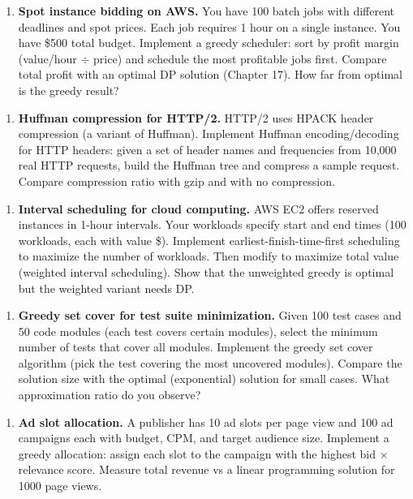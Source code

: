 \begin{enumerate}
\item \textbf{Spot instance bidding on AWS.} You have 100 batch jobs with different deadlines and spot prices. Each job requires 1 hour on a single instance. You have \$500 total budget. Implement a greedy scheduler: sort by profit margin (value/hour $\div $ price) and schedule the most profitable jobs first. Compare total profit with an optimal DP solution (Chapter 17). How far from optimal is the greedy result?
\end{enumerate}

\begin{enumerate}
\item \textbf{Huffman compression for HTTP/2.} HTTP/2 uses HPACK header compression (a variant of Huffman). Implement Huffman encoding/decoding for HTTP headers: given a set of header names and frequencies from 10,000 real HTTP requests, build the Huffman tree and compress a sample request. Compare compression ratio with gzip and with no compression.
\end{enumerate}

\begin{enumerate}
\item \textbf{Interval scheduling for cloud computing.} AWS EC2 offers reserved instances in 1-hour intervals. Your workloads specify start and end times (100 workloads, each with value \$). Implement earliest-finish-time-first scheduling to maximize the number of workloads. Then modify to maximize total value (weighted interval scheduling). Show that the unweighted greedy is optimal but the weighted variant needs DP.
\end{enumerate}

\begin{enumerate}
\item \textbf{Greedy set cover for test suite minimization.} Given 100 test cases and 50 code modules (each test covers certain modules), select the minimum number of tests that cover all modules. Implement the greedy set cover algorithm (pick the test covering the most uncovered modules). Compare the solution size with the optimal (exponential) solution for small cases. What approximation ratio do you observe?
\end{enumerate}

\begin{enumerate}
\item \textbf{Ad slot allocation.} A publisher has 10 ad slots per page view and 100 ad campaigns each with budget, CPM, and target audience size. Implement a greedy allocation: assign each slot to the campaign with the highest bid $\times $ relevance score. Measure total revenue vs a linear programming solution for 1000 page views.
\end{enumerate}

